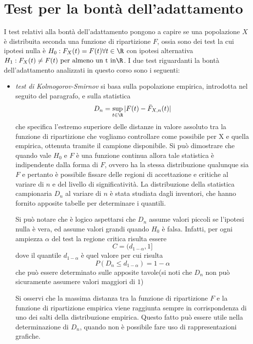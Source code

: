 \section{Test per la bontà dell'adattamento}
I test relativi alla bontà dell'adattamento pongono a capire se una popolazione $X$ è distribuita seconda una funzione
di ripartizione $F$, ossia sono dei test la cui ipotesi nulla è $H_0:F_X(t) = F(t) \forall t \in \R$ con ipotesi
alternativa $H_1:F_X(t) \neq F(t) \mbox{ per almeno un t in} \R$.\newline
I due test riguardanti la bontà dell'adattamento analizzati in questo corso sono i seguenti:
\begin{itemize}
    \item \emph{test di Kolmogorov-Smirnov} si basa sulla popolazione empirica, introdotta nel seguito del paragrafo, e
        sulla statistica
        \[ D_n = \sup _{t \in \R} |F(t) - \bar{F}_{X, n}(t)| \]
        che specifica l'estremo superiore delle distanze in valore assoluto tra la funzione di ripartizione che vogliamo
        controllare come possibile per X e quella empirica, ottenuta tramite il campione disponibile.\newline
        Si può dimostrare che quando vale $H_0$ e $F$ è una funzione continua allora tale statistica è indipendente 
        dalla forma di $F$, ovvero ha la stessa distribuzione qualunque sia $F$ e pertanto è possibile fissare delle 
        regioni di accettazione e critiche al variare di $n$ e del livello di significatività.\newline
        La distribuzione della statistica campionaria $D_n$ al variare di $n$ è stata studiata dagli inventori,
        che hanno fornito apposite tabelle per determinare i quantili.

        Si può notare che è logico aspettarsi che  $D_n$ assume valori piccoli se l'ipotesi nulla è vera, ed assume 
        valori grandi quando $H_0$ è falsa.\newline
        Infatti, per ogni ampiezza $\alpha$ del test la regione critica risulta essere
        \[ C = (d_{1 - \alpha}, 1] \]
        dove il quantile $d_{1 - \alpha}$ è quel valore per cui risulta 
        \[ P(D_n \leq d_{1 - \alpha}) = 1 - \alpha \]
        che può essere determinato sulle apposite tavole(si noti che $D_n$ non può sicuramente assumere valori maggiori di $1$)

        Si osservi che la massima distanza tra la funzione di ripartizione $F$ e la funzione di ripartizione empirica 
        viene raggiunta sempre in corrispondenza di uno dei salti della distribuzione empirica.\newline
        Questo fatto può essere utile nella determinazione di $D_n$, quando non è possibile fare uso di rappresentazioni grafiche.
        

\end{itemize}
